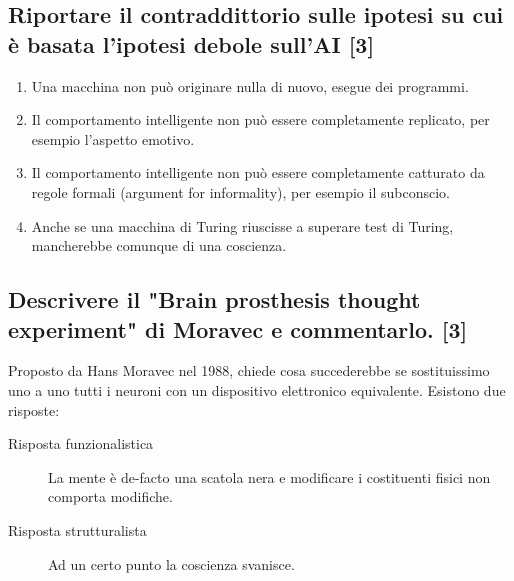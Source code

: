 \documentclass[\main/main.tex]{subfiles}
\begin{document}
\subsection{Riportare il contraddittorio sulle ipotesi su cui è basata l'ipotesi debole sull'AI [3]}
\begin{enumerate}
  \item Una macchina non può originare nulla di nuovo, esegue dei programmi.
  \item Il comportamento intelligente non può essere completamente replicato, per esempio l'aspetto emotivo.
  \item Il comportamento intelligente non può essere completamente catturato da regole formali (argument for informality), per esempio il subconscio.
  \item Anche se una macchina di Turing riuscisse a superare test di Turing, mancherebbe comunque di una coscienza.
\end{enumerate}

\subsection{Descrivere il "Brain prosthesis thought experiment" di Moravec e commentarlo. [3]}
Proposto da Hans Moravec nel 1988, chiede cosa succederebbe se sostituissimo uno a uno tutti i neuroni con un dispositivo elettronico equivalente. Esistono due risposte:
\begin{description}
  \item[Risposta funzionalistica] La mente è de-facto una scatola nera e modificare i costituenti fisici non comporta modifiche.
  \item[Risposta strutturalista] Ad un certo punto la coscienza svanisce.
\end{description}
\end{document}

